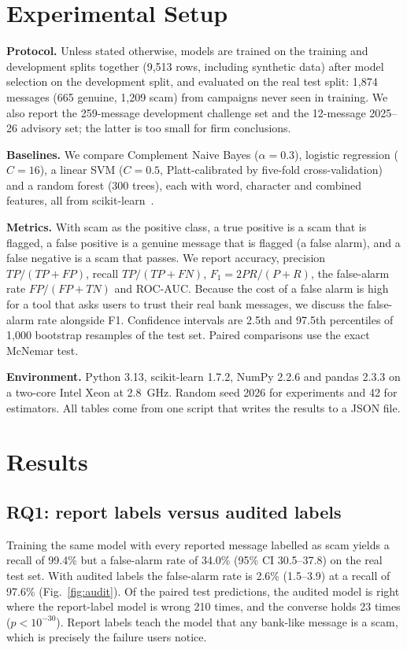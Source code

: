 \documentclass[conference]{IEEEtran}
\begin{document}
\section{Experimental Setup}
\label{sec:setup}

\textbf{Protocol.} Unless stated otherwise, models are trained on the training and development splits together (9,513 rows, including synthetic data) after model selection on the development split, and evaluated on the real test split: 1,874 messages (665 genuine, 1,209 scam) from campaigns never seen in training. We also report the 259-message development challenge set and the 12-message 2025--26 advisory set; the latter is too small for firm conclusions.

\textbf{Baselines.} We compare Complement Naive Bayes ($\alpha=0.3$), logistic regression ($C=16$), a linear SVM ($C=0.5$, Platt-calibrated by five-fold cross-validation) and a random forest (300 trees), each with word, character and combined features, all from scikit-learn~\cite{pedregosa2011scikit}.

\textbf{Metrics.} With scam as the positive class, a true positive is a scam that is flagged, a false positive is a genuine message that is flagged (a false alarm), and a false negative is a scam that passes. We report accuracy, precision $TP/(TP+FP)$, recall $TP/(TP+FN)$, $F_1=2PR/(P+R)$, the false-alarm rate $FP/(FP+TN)$ and ROC-AUC. Because the cost of a false alarm is high for a tool that asks users to trust their real bank messages, we discuss the false-alarm rate alongside F1. Confidence intervals are 2.5th and 97.5th percentiles of 1,000 bootstrap resamples of the test set. Paired comparisons use the exact McNemar test.

\textbf{Environment.} Python 3.13, scikit-learn 1.7.2, NumPy 2.2.6 and pandas 2.3.3 on a two-core Intel Xeon at 2.8~GHz. Random seed 2026 for experiments and 42 for estimators. All tables come from one script that writes the results to a JSON file.

\section{Results}
\label{sec:results}

\subsection{RQ1: report labels versus audited labels}
Training the same model with every reported message labelled as scam yields a recall of 99.4\% but a false-alarm rate of 34.0\% (95\% CI 30.5--37.8) on the real test set. With audited labels the false-alarm rate is 2.6\% (1.5--3.9) at a recall of 97.6\% (Fig.~\ref{fig:audit}). Of the paired test predictions, the audited model is right where the report-label model is wrong 210 times, and the converse holds 23 times ($p<10^{-30}$). Report labels teach the model that any bank-like message is a scam, which is precisely the failure users notice.
\end{document}
